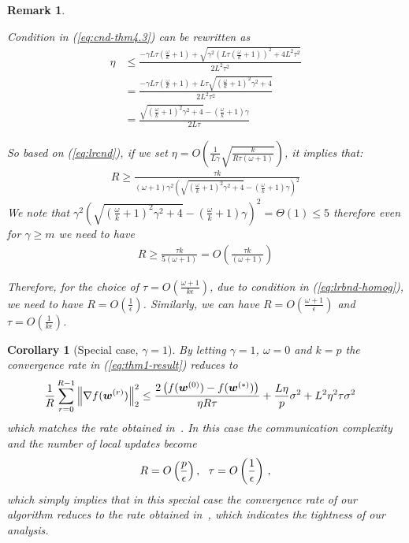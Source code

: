 \documentclass[twoside]{article}
\newtheorem{remark}{Remark}
\newtheorem{corollary}{Corollary}
\begin{document}
\begin{remark}\label{rmk:cnd-lr}

Condition in (\ref{eq:cnd-thm4.3}) can be rewritten as 
\begin{align}
    \eta&\leq \frac{-\gamma L\tau\left(\frac{\omega}{k}+1\right)+\sqrt{\gamma^2 \left(L\tau\left(\frac{\omega}{k}+1\right)\right)^2+4L^2\tau^2}}{2L^2\tau^2}\nonumber\\
    &= \frac{-\gamma L\tau\left(\frac{\omega}{k}+1\right)+L\tau\sqrt{\left(\frac{\omega}{k}+1\right)^2\gamma^2 +4}}{2L^2\tau^2}\nonumber\\
    &=\frac{\sqrt{\left(\frac{\omega}{k}+1\right)^2\gamma^2 +4}-\left(\frac{\omega}{k}+1\right)\gamma}{2L\tau}\label{eq:lrcnd}
\end{align}

So based on (\ref{eq:lrcnd}), if we set $\eta=O\left(\frac{1}{L\gamma}\sqrt{\frac{k}{R\tau\left(\omega+1\right)}}\right)$, it implies that:
\begin{align}
    R\geq \frac{\tau k}{\left(\omega+1\right)\gamma^2\left(\sqrt{\left(\frac{\omega}{k}+1\right)^2\gamma^2+4}-\left(\frac{\omega}{k}+1\right)\gamma\right)^2}\label{eq:iidexact}
\end{align}
We note that $\gamma^2\left(\sqrt{\left(\frac{\omega}{k}+1\right)^2\gamma^2+4}-\left(\frac{\omega}{k}+1\right)\gamma\right)^2=\Theta(1)\leq 5 $ therefore even for $\gamma\geq m$ we need to have 
\begin{align}
    R\geq \frac{\tau k}{5\left(\omega+1\right)}=O\left(\frac{\tau k}{\left(\omega+1\right)}\right)\label{eq:lrbnd-homog}
\end{align}

{Therefore, for the choice of $\tau=O\left(\frac{\omega+1}{k\epsilon}\right)$, due to condition in (\ref{eq:lrbnd-homog}), we need to have $R=O\left(\frac{1}{\epsilon}\right)$. Similarly, we can have $R=O\left(\frac{\omega+1}{\epsilon}\right)$ and $\tau=O\left(\frac{1}{k\epsilon}\right)$.}


\end{remark}

\begin{corollary}[Special case, $\gamma=1$]
By letting $\gamma=1$, $\omega=0$ and $k=p$ the convergence rate in (\ref{eq:thm1-result}) reduces to 
\begin{align}\notag
     \frac{1}{R}\sum_{r=0}^{R-1}\left\|\nabla f({\boldsymbol{w}}^{(r)})\right\|_2^2&\leq \frac{2\left(f(\boldsymbol{w}^{(0)})-f(\boldsymbol{w}^{(*)})\right)}{\eta R\tau}+\frac{L\eta }{p}\sigma^2+{L^2\eta^2\tau }\sigma^2
\end{align}
which matches the rate  obtained in~\cite{wang2018cooperative}. In this case the communication complexity and the number of local updates become 
\begin{align}\notag
    {R}=O\left(\frac{p}{\epsilon}\right), \:\:\: \tau=O\left(\frac{1}{\epsilon}\right) \, ,
\end{align}
which simply implies  that in this special case the convergence rate of our algorithm reduces to the  rate obtained in~\cite{wang2018cooperative}, which indicates the tightness of  our analysis.
\end{corollary}
\end{document}

